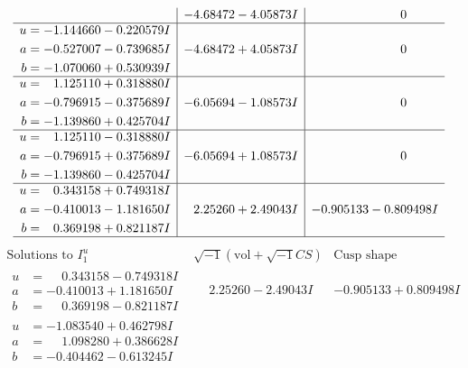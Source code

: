 \documentclass[1p]{elsarticle_modified}
\theoremstyle{definition}
\newcommand{\I}{\sqrt{-1}}
\begin{document}
$$\begin{array}{c|c|c}
 & -4.68472 - 4.05873 I & \phantom{-0.000000 } 0 \\ \hline\begin{aligned}
u &= -1.144660 - 0.220579 I \\
a &= -0.527007 - 0.739685 I \\
b &= -1.070060 + 0.530939 I\end{aligned}
 & -4.68472 + 4.05873 I & \phantom{-0.000000 } 0 \\ \hline\begin{aligned}
u &= \phantom{-}1.125110 + 0.318880 I \\
a &= -0.796915 - 0.375689 I \\
b &= -1.139860 + 0.425704 I\end{aligned}
 & -6.05694 - 1.08573 I & \phantom{-0.000000 } 0 \\ \hline\begin{aligned}
u &= \phantom{-}1.125110 - 0.318880 I \\
a &= -0.796915 + 0.375689 I \\
b &= -1.139860 - 0.425704 I\end{aligned}
 & -6.05694 + 1.08573 I & \phantom{-0.000000 } 0 \\ \hline\begin{aligned}
u &= \phantom{-}0.343158 + 0.749318 I \\
a &= -0.410013 - 1.181650 I \\
b &= \phantom{-}0.369198 + 0.821187 I\end{aligned}
 & \phantom{-}2.25260 + 2.49043 I & -0.905133 - 0.809498 I\\
 \hline 
 \end{array}$$\newpage$$\begin{array}{c|c|c}  
\text{Solutions to }I^u_{1}& \I (\text{vol} + \sqrt{-1}CS) & \text{Cusp shape}\\
 \hline 
\begin{aligned}
u &= \phantom{-}0.343158 - 0.749318 I \\
a &= -0.410013 + 1.181650 I \\
b &= \phantom{-}0.369198 - 0.821187 I\end{aligned}
 & \phantom{-}2.25260 - 2.49043 I & -0.905133 + 0.809498 I \\ \hline\begin{aligned}
u &= -1.083540 + 0.462798 I \\
a &= \phantom{-}1.098280 + 0.386628 I \\
b &= -0.404462 - 0.613245 I\end{aligned}

\end{array}$$
\end{document}
